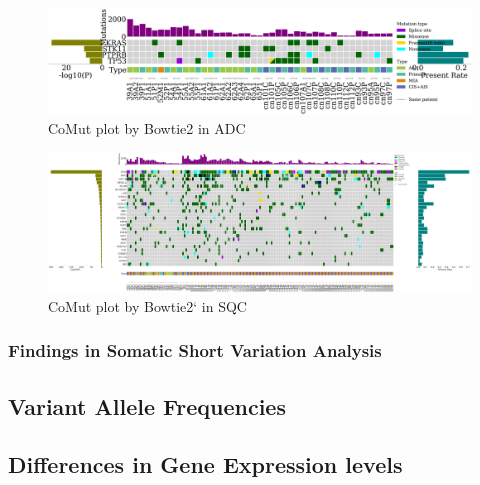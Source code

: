 \documentclass[11pt,a4paper,onecolumn,oneside]{report}
\begin{document}
                \begin{figure}[p]
                    \centering
                    \includegraphics[width=\linewidth]{figures/Mutect2/Bowtie2-ADC.pdf}
                    \caption{CoMut plot by Bowtie2 in ADC}
                    \label{fig:comut-Bowtie2-ADC}
                \end{figure}

                \begin{figure}[p]
                    \centering
                    \includegraphics[width=\linewidth]{figures/Mutect2/Bowtie2-SQC.pdf}
                    \caption{CoMut plot by Bowtie2` in SQC}
                    \label{fig:comut-Bowtie2-SQC}
                \end{figure}

            \subsubsection{Findings in Somatic Short Variation Analysis}

        \subsection{Variant Allele Frequencies}

        \subsection{Differences in Gene Expression levels}
\end{document}
